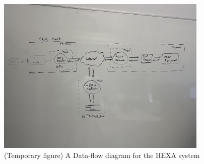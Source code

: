 
\begin{figure}[ht!]
    \centering
    \includegraphics[width=0.9\textwidth]{images/dfd}
    \caption{(Temporary figure) A Data-flow diagram for the HEXA system}
    \label{fig:dfd}
\end{figure}
